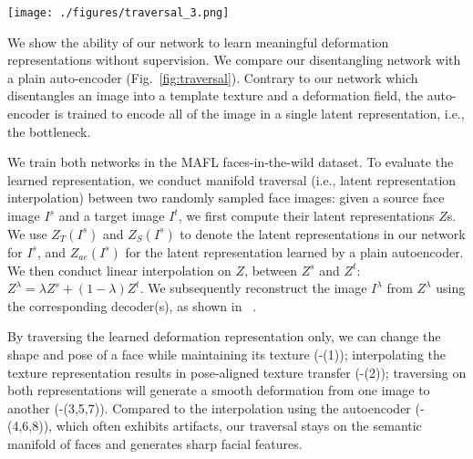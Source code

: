 \documentclass[runningheads]{llncs}
\begin{document}
\begin{figure*}[!h]
    \centering
    \texttt{[image: ./figures/traversal\_3.png]}
    \caption{Latent representation interpolation: we embed a face image in the latent space provided by an encoder network trained on the MAFL dataset. Our network disentangles the texture and deformation in the respective parts of the latent representation vector,  allowing a meaningful interpolation between images. Interpolating the deformation-specific part of the latent representation changes the face shape and pose (1); interpolating the latent representation for texture will generate a pose-aligned texture transfer between the images (2); traversing both latent representations will generate smooth and sharp image deformations (3,5,7). In contrast, when using a standard auto-encoder (4,6,8) such an interpolation often yields artifacts. For more results, please see Figure~\ref{fig:supp_walk1},\ref{fig:supp_walk2} in Appendix.}
    \label{fig:traversal}
\end{figure*}



We show the ability of our network to learn meaningful deformation representations without supervision. We compare our disentangling network with a plain auto-encoder (Fig.~\ref{fig:traversal}). Contrary to our network which disentangles an image into a template texture and a deformation field, the auto-encoder is trained to encode all of the image in a single latent representation, i.e., the bottleneck.  

We train both networks in the MAFL faces-in-the-wild dataset. To evaluate the learned representation, we conduct manifold traversal (i.e., latent representation interpolation) between two randomly sampled face images: given a source face image $I^s$ and a target image $I^t$, we first compute their latent representations $Z$s. We use $Z_T(I^s)$ and $Z_S(I^s)$ to denote the latent representations in our network for $I^s$, and $Z_{ae}(I^s)$ for the latent representation learned by a plain autoencoder. We then conduct linear interpolation on $Z$, between $Z^s$ and $Z^t$: 
$Z^{\lambda} = \lambda Z^s + (1-\lambda) Z^t 
$.
We subsequently reconstruct the image $I^{\lambda}$ from $Z^{\lambda}$ using the corresponding decoder(s), as shown in ~.

By traversing the learned deformation representation only, we can change the shape and pose of a face while maintaining its texture (-(1)); interpolating the texture representation results in pose-aligned texture transfer (-(2)); traversing on both representations will generate a smooth deformation from one image to another (-(3,5,7)). Compared to the interpolation using the autoencoder (-(4,6,8)), which often exhibits artifacts, our traversal stays on the semantic manifold of faces and generates sharp facial features.
\end{document}
